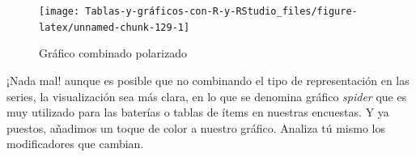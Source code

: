 \documentclass[
]{book}
\newenvironment{Shaded}{\begin{snugshade}}{\end{snugshade}}
\newcommand{\AttributeTok}[1]{\textcolor[rgb]{0.77,0.63,0.00}{#1}}
\newcommand{\ConstantTok}[1]{\textcolor[rgb]{0.00,0.00,0.00}{#1}}
\newcommand{\FunctionTok}[1]{\textcolor[rgb]{0.00,0.00,0.00}{#1}}
\newcommand{\NormalTok}[1]{#1}
\newcommand{\SpecialCharTok}[1]{\textcolor[rgb]{0.00,0.00,0.00}{#1}}
\newcommand{\StringTok}[1]{\textcolor[rgb]{0.31,0.60,0.02}{#1}}
\begin{document}
\begin{Shaded}
\end{Shaded}

\begin{figure}[H]

{\centering \texttt{[image: Tablas-y-gráficos-con-R-y-RStudio\_files/figure-latex/unnamed-chunk-129-1]} 

}

\caption{Gráfico combinado polarizado}\label{fig:unnamed-chunk-129}
\end{figure}

¡Nada mal! aunque es posible que no combinando el tipo de representación en las series, la visualización sea más clara, en lo que se denomina gráfico \emph{spider} que es muy utilizado para las baterías o tablas de ítems en nuestras encuestas. Y ya puestos, añadimos un toque de color a nuestro gráfico. Analiza tú mismo los modificadores que cambian.
\end{document}
